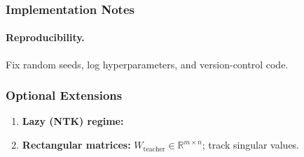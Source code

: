 \documentclass[11pt]{article}
\newcommand{\R}{\mathbb{R}}
\newcommand{\Wteacher}{\ensuremath{W_{\mathrm{teacher}}}}
\begin{document}
\subsubsection*{Implementation Notes}

\paragraph*{Reproducibility.}
Fix random seeds, log hyperparameters, and version-control code.

\subsubsection*{Optional Extensions}

\begin{enumerate}[label=\textbf{\Alph*.},leftmargin=*,nosep]
  \item \textbf{Lazy (NTK) regime:}
  \item \textbf{Rectangular matrices:} \(\Wteacher\in\R^{m\times n}\); track singular values.
\end{enumerate}
\end{document}
